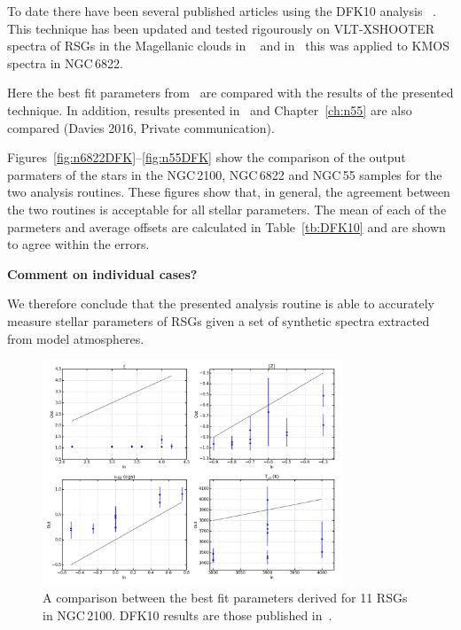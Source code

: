 To date there have been several published articles using the DFK10 analysis
~\citep{2010MNRAS.407.1203D,2015ApJ...803...14P,2015ApJ...806...21D}.
This technique has been updated and tested rigourously on VLT-XSHOOTER spectra of RSGs in the Magellanic clouds in
~\cite{2015ApJ...806...21D} and in~\cite[][which Chapter~\ref{ch:6822} is based upon]{2015ApJ...803...14P} this was applied to KMOS spectra in NGC\,6822.

Here the best fit parameters from~\cite{2015ApJ...803...14P} are compared with the results of the presented technique.
In addition, results presented in~\citep{2016arXiv160202702P} and Chapter~\ref{ch:n55} are also compared (Davies 2016, Private communication).

Figures~\ref{fig:n6822DFK}--\ref{fig:n55DFK} show the comparison of the output parmaters of the stars in the NGC\,2100, NGC\,6822 and NGC\,55 samples for the two analysis routines.
These figures show that, in general, the agreement between the two routines is acceptable for all stellar parameters.
The mean of each of the parmeters and average offsets are calculated in Table~\ref{tb:DFK10} and are shown to agree within the errors.

\textbf{Comment on individual cases?}

We therefore conclude that the presented analysis routine is able to accurately measure stellar parameters of RSGs given a set of synthetic spectra extracted from model atmospheres.
\begin{figure}
 \centering
 \includegraphics[width=0.80\textwidth]{JAnal/Fakespec-t2-v1}
 \caption[NGC\,2100 DFK10 best fit parameter comparison]{
A comparison between the best fit parameters derived for 11 RSGs in NGC\,2100.
DFK10 results are those published in~\cite{2015ApJ...803...14P}.
\label{fig:n2100DFK}
         }
\end{figure}

